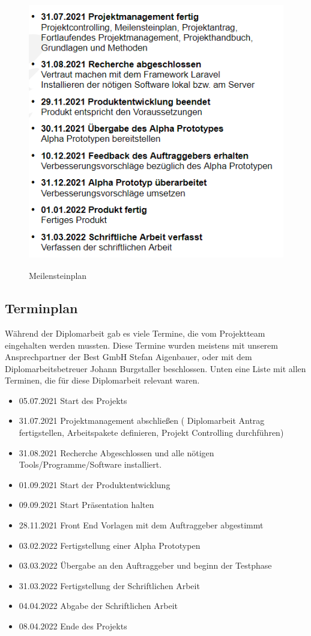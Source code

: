 \begin{figure}[h]
	\centering
	\includegraphics[height=12cm,width=12cm]{images/Meilensteinplan}
	\caption{Meilensteinplan}
	\label{fig:Meilensteinplan }
\end{figure}

\newpage
\subsection{Terminplan}
Während der Diplomarbeit gab es viele Termine, die vom Projektteam eingehalten werden mussten. Diese Termine wurden meistens mit unserem Ansprechpartner der Best GmbH Stefan Aigenbauer, oder mit dem Diplomarbeitsbetreuer Johann Burgstaller beschlossen.
Unten eine Liste mit allen Terminen, die für diese Diplomarbeit relevant waren.

\begin{itemize}
	\item  05.07.2021 Start des Projekts
	\item 31.07.2021 Projektmanagement abschließen ( Diplomarbeit Antrag fertigstellen, Arbeitspakete definieren, Projekt Controlling durchführen)
	\item  31.08.2021 Recherche Abgeschlossen und alle nötigen Tools/Programme/Software installiert.
	\item 01.09.2021 Start der Produktentwicklung
	\item 09.09.2021 Start Präsentation halten
	\item 28.11.2021 Front End Vorlagen mit dem Auftraggeber abgestimmt
	\item 03.02.2022 Fertigstellung einer Alpha Prototypen 
	\item 03.03.2022 Übergabe an den Auftraggeber und beginn der Testphase
	\item 31.03.2022 Fertigstellung der Schriftlichen Arbeit
	\item 04.04.2022 Abgabe der Schriftlichen Arbeit 
	\item 08.04.2022 Ende des Projekts 
	
\end{itemize}






